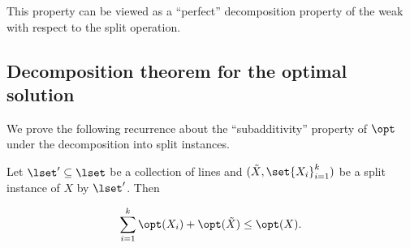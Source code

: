 \documentclass{toc}
\begin{document}
This property can be viewed as a ``perfect'' decomposition property of the weak \WBone with respect to the split operation. 
%







\subsection{Decomposition theorem for the optimal solution}
\label{sec:decompose opt}  

We prove the following recurrence about the ``subadditivity'' property of $\opt$ under the decomposition into split instances. 
%

\begin{theorem}
        \label{thm: opt decomposes} 
Let $\lset' \subseteq \lset$ be a collection of lines and $(\tilde{X}, \set{X_i}_{i=1}^k)$ be a split instance of $X$ by $\lset'$. Then 
%
        
         $$\sum_{i =1}^k\opt(X_i) + \opt(\tilde{X}) \leq \opt(X).$$
\end{theorem}
\end{document}
